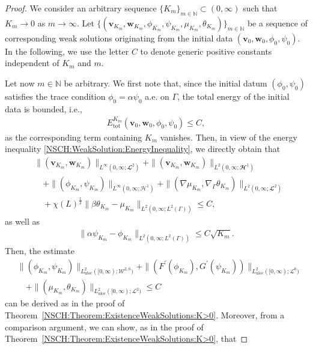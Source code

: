 \documentclass[11pt,reqno]{amsart}
\theoremstyle{remark}
\numberwithin{equation}{section}
\newcommand{\norm}[1]{\| #1 \|}
\newcommand{\N}{\mathbb N}
\newcommand{\Grad}{\nabla}
\newcommand{\Gradg}{\nabla_\Ga}
\newcommand{\Ga}{\Gamma}
\newcommand{\bv}{\mathbf v}
\newcommand{\bw}{\mathbf w}
\begin{document}
\begin{proof}
    We consider an arbitrary sequence $\{K_m\}_{m\in\N}\subset(0,\infty)$ such that $K_m\rightarrow0$ as $m\rightarrow\infty$. Let $\{(\bv_{K_m},\bw_{K_m},\phi_{K_m},\psi_{K_m},\mu_{K_m},\theta_{K_m})\}_{m\in\N}$ be a sequence of corresponding weak solutions  
	originating from the initial data $(\bv_0,\bw_0,\phi_0,\psi_0)$. In the following, we use the letter $C$ to denote generic positive constants independent of $K_m$ and $m$. 
    
    Let now $m\in\N$ be arbitrary. We first note that, since the initial datum $(\phi_0,\psi_0)$ satisfies the trace condition $\phi_0 = \alpha\psi_0$ a.e. on $\Ga$, the total energy of the initial data is bounded, i.e.,
    \begin{align*}
    	E_\mathrm{tot}^{K_m}(\bv_0,\bw_0,\phi_0,\psi_0) \leq C,
    \end{align*}
    as the corresponding term containing $K_m$ vanishes. Then, in view of the energy inequality \eqref{NSCH:WeakSolution:EnergyInequality}, we directly obtain that
   	\begin{align}\label{NSCH:K0:Est:Uniform}
   		&\norm{(\bv_{K_m},\bw_{K_m})}_{L^\infty(0,\infty;\mathbfcal{L}^2)} + \norm{(\bv_{K_m},\bw_{K_m})}_{L^2(0,\infty;\mathbfcal{H}^1)} \nonumber \\
   		&\quad + \norm{(\phi_{K_m},\psi_{K_m})}_{L^\infty(0,\infty;\mathcal{H}^1)} + \norm{(\Grad\mu_{K_m},\Gradg\theta_{K_m})}_{L^2(0,\infty;\mathbfcal{L}^2)} \nonumber \\
   		&\quad + \chi(L)^{\frac12}\norm{\beta\theta_{K_m} - \mu_{K_m}}_{L^2(0,\infty;L^2(\Ga))} \leq C,
   	\end{align}
   	as well as
   	\begin{align}\label{NSCH:K0:Est:Uniform:ap-p}
   		\norm{\alpha\psi_{K_m} - \phi_{K_m}}_{L^2(0,\infty;L^2(\Ga))} \leq C\sqrt{K_m}.
   	\end{align}
   	Then, the estimate
   	\begin{align}\label{NSCH:K0:Est:Uniform:High}
   		&\norm{(\phi_{K_m},\psi_{K_m})}_{L^2_{\mathrm{uloc}}([0,\infty);\mathcal{W}^{2,6})} + \norm{(F^\prime(\phi_{K_m}),G^\prime(\psi_{K_m}))}_{L^2_{\mathrm{uloc}}([0,\infty);\mathcal{L}^6)} \nonumber \\
   		&\quad + \norm{(\mu_{K_m},\theta_{K_m})}_{L^2_{\mathrm{uloc}}([0,\infty);\mathcal{L}^2)} \leq C
   	\end{align}
   	can be derived as in the proof of Theorem~\ref{NSCH:Theorem:ExistenceWeakSolutions:K>0}. Moreover, from a comparison argument, we can show, as in the proof of Theorem~\ref{NSCH:Theorem:ExistenceWeakSolutions:K>0}, that

\end{proof}
\end{document}
